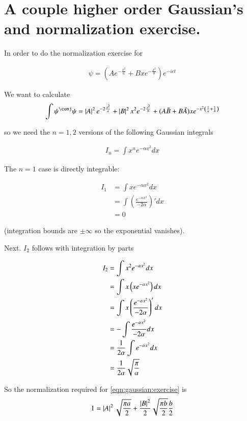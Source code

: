 \section{A couple higher order Gaussian's and normalization exercise. }

In order to do the normalization exercise for

\begin{align}\label{eqn:gaussian:exercise}
\psi = \left(A e^{-\frac{x^2}{a}} +B x e^{-\frac{x^2}{b}}\right) e^{-ict}
\end{align}

We want to calculate
\begin{align*}
\int \psi^\conj \psi = 
\Abs{A}^2 e^{-2\frac{x^2}{a}} +\Abs{B}^2 x^2 e^{-2\frac{x^2}{b}}
+ (A\bar{B} + B\bar{A}) x e^{-x^2\left(\inv{a} + \inv{b}\right)}
\end{align*}

so we need the $n=1,2$ versions of the following Gaussian integrals

\begin{align*}
I_n = \int x^n e^{-\alpha x^2} dx
\end{align*}

The $n=1$ case is directly integrable:

\begin{align*}
I_1 
&= \int x e^{-\alpha x^2} dx \\
&= \int \left(\frac{e^{-\alpha x^2}}{-2\alpha}\right)' dx \\
&= 0
\end{align*}

(integration bounds are $\pm \infty$ so the exponential vanishes).

Next.  $I_2$ follows with integration by parts

\begin{align*}
I_2 
&= \int x^2 e^{-\alpha x^2} dx \\
&= \int x \left(x e^{-\alpha x^2}\right) dx \\
&= \int x \left(\frac{e^{-\alpha x^2}}{-2\alpha}\right)' dx \\
&= -\int \frac{e^{-\alpha x^2}}{-2\alpha} dx \\
&= \frac{1}{2\alpha}\int e^{-\alpha x^2} dx \\
&= \frac{1}{2\alpha} \sqrt{\frac{\pi}{\alpha}}
\end{align*}

So the normalization required for \ref{eqn:gaussian:exercise} is
\begin{align*}
1 = \left\lvert{A}\right\rvert^2 \sqrt{\frac{\pi a}{2}} + \frac{\left\lvert{B}\right\rvert^2}{2} 
\sqrt{\frac{\pi b}{2}} \frac{b}{2}
\end{align*}

